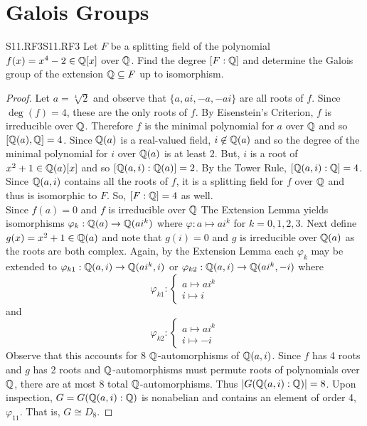 \documentclass[../AlgebraQualSolutions.tex]{subfiles}
\begin{document}
\section{Galois Groups}

\begin{prob}{S11.RF3}{S11.RF3}
    Let $F$ be a splitting field of the polynomial $f(x) = x^4 - 2 \in \mathbb{Q}[x]$ over $\mathbb{Q}$. Find the degree $[F: \mathbb{Q}]$ and determine the Galois group of the extension $\mathbb{Q} \subseteq F$ up to isomorphism.
\end{prob}

\begin{proof}
    Let $a = \sqrt[4]{2}$ and  observe that $\{a,ai,-a,-ai\}$ are all roots of $f$. Since $\deg(f) = 4$, these are the only roots of $f$. By Eisenstein's Criterion, $f$ is irreducible over $\mathbb{Q}$. Therefore $f$ is the minimal polynomial for $a$ over $\mathbb{Q}$ and so $[\mathbb{Q}(a),\mathbb{Q}] = 4$. Since $\mathbb{Q}(a)$ is a real-valued field, $i \not\in \mathbb{Q}(a)$ and so the degree of the minimal polynomial for $i$ over $\mathbb{Q}(a)$ is at least 2. But, $i$ is a root of $x^2 + 1 \in \mathbb{Q}(a)[x]$ and so $[\mathbb{Q}(a,i): \mathbb{Q}(a)] = 2$. By the Tower Rule, $[\mathbb{Q}(a,i): \mathbb{Q}] = 4$. Since $\mathbb{Q}(a,i)$ contains all the roots of $f$, it is a splitting field for $f$ over $\mathbb{Q}$ and thus is isomorphic to $F$. So, $[F: \mathbb{Q}] = 4$ as well.\\

    Since $f(a) = 0$ and $f$ is irreducible over $\mathbb{Q}$ The Extension Lemma yields isomorphisms $\varphi_k: \mathbb{Q}(a) \to \mathbb{Q}(ai^k)$ where $\varphi:a \mapsto ai^k$ for $k = 0,1,2,3$. Next define $g(x) = x^2 + 1 \in \mathbb{Q}(a)$ and note that $g(i) = 0$ and $g$ is irreducible over $\mathbb{Q}(a)$ as the roots are both complex. Again, by the Extension Lemma each $\varphi_k$ may be extended to $\varphi_{k1}: \mathbb{Q}(a,i) \to \mathbb{Q}(ai^k, i)$ or $\varphi_{k2}: \mathbb{Q}(a,i) \to \mathbb{Q}(ai^k,-i)$ where
        \[\varphi_{k1}: \begin{cases}
            a \mapsto ai^k\\
            i \mapsto i
        \end{cases}\]
    and
        \[\varphi_{k2}: \begin{cases}
        a \mapsto ai^k\\
        i \mapsto -i
    \end{cases}\]
    Observe that this accounts for 8 $\mathbb{Q}$-automorphisms of $\mathbb{Q}(a,i)$. Since $f$ has 4 roots and $g$ has 2 roots and $\mathbb{Q}$-automorphisms must permute roots of polynomials over $\mathbb{Q}$, there are at most 8 total $\mathbb{Q}$-automorphisms. Thus $|G(\mathbb{Q}(a,i): \mathbb{Q})| = 8$. Upon inspection, $G = G(\mathbb{Q}(a,i): \mathbb{Q})$ is nonabelian and contains an element of order 4, $\varphi_{11}$. That is, $G \cong D_8$. 
\end{proof}
\end{document}
